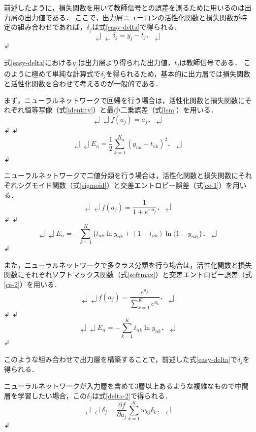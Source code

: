 前述したように，損失関数を用いて教師信号との誤差を測るために用いるのは出力層の出力値である．
ここで，出力層ニューロンの活性化関数と損失関数が特定の組み合わせであれば，$\delta_j$は式\ref{easy-delta}で得られる．
\begin{equation}↲
\label{easy-delta}↲
\delta_j = y_j - t_j．↲
\end{equation}↲

式\ref{easy-delta}における$y_j$は出力層より得られた出力値，$t_j$は教師信号である．
このように極めて単純な計算式で$\delta_j$を得られるため，基本的に出力層では損失関数と活性化関数を合わせて考えるのが一般的である．

まず，ニューラルネットワークで回帰を行う場合は，活性化関数と損失関数にそれぞれ恒等写像（式\ref{identity}）と最小二乗誤差（式\ref{lsm}）を用いる．
\begin{equation}↲
\label{identity}↲
f(a_j) = a_j．↲
\end{equation}↲
↲
\begin{equation}↲
\label{lsm}↲
E_n = \frac{1}{2} \sum_{k=1}^K (y_{nk} - t_{nk})^2．↲
\end{equation}↲

ニューラルネットワークで二値分類を行う場合は，活性化関数と損失関数にそれぞれシグモイド関数（式\ref{sigmoid}）と交差エントロピー誤差（式\ref{ce-1}）を用いる．
\begin{equation}↲
\label{sigmoid}↲
f(a_j) = \frac{1}{1 + e^{-a_j}}．↲
\end{equation}↲
↲
\begin{equation}↲
\label{ce-1}↲
E_n = - \sum_{k=1}^K \{t_{nk} \ln y_{nk} + (1 - t_{nk}) \ln (1 - y_{nk)}\}．↲
\end{equation}↲

また，ニューラルネットワークで多クラス分類を行う場合は，活性化関数と損失関数にそれぞれソフトマックス関数（式\ref{softmax}）と交差エントロピー誤差（式\ref{ce-2}）を用いる．
\begin{equation}↲
\label{softmax}↲
f(a_j) = \frac{e^{a_j}}{\sum_{k=1}^K e^{a_k}}．↲
\end{equation}↲
↲
\begin{equation}↲
\label{ce-2}↲
E_n = - \sum_{k=1}^K t_{nk} \ln y_{nk}．↲
\end{equation}↲

このような組み合わせで出力層を構築することで，前述した式\ref{easy-delta}で$\delta_j$を得られる．

ニューラルネットワークが入力層を含めて3層以上あるような複雑なもので中間層を学習したい場合，この$\delta_j$は式\ref{delta-2}で得られる．
\begin{equation}↲
\label{delta-2}↲
\delta_j = \frac{\partial f}{\partial a_j} \sum_{k=1}^K w_{kj} \delta_k．↲
\end{equation}↲

